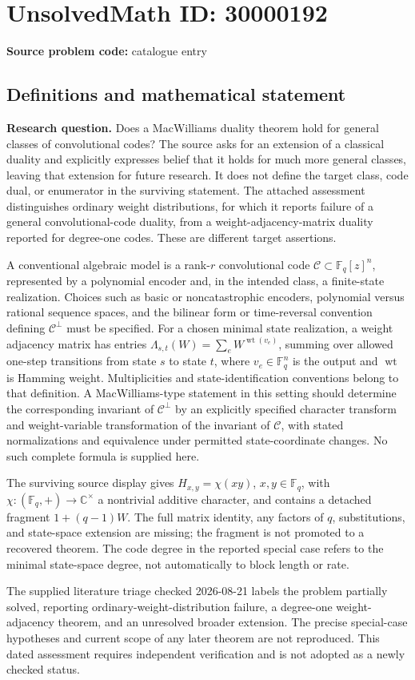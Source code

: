 \documentclass[11pt]{article}
\newcommand{\C}{\mathbb{C}}
\newcommand{\F}{\mathbb{F}}
\begin{document}
\section*{UnsolvedMath ID: 30000192}
\textbf{Source problem code:} catalogue entry
\subsection{Definitions and mathematical statement}
\textbf{Research question.} Does a MacWilliams duality theorem hold for general classes of convolutional codes? The source asks for an extension of a classical duality and explicitly expresses belief that it holds for much more general classes, leaving that extension for future research. It does not define the target class, code dual, or enumerator in the surviving statement. The attached assessment distinguishes ordinary weight distributions, for which it reports failure of a general convolutional-code duality, from a weight-adjacency-matrix duality reported for degree-one codes. These are different target assertions.\par A conventional algebraic model is a rank-\(r\) convolutional code \(\mathcal C\subset\F_q[z]^n\), represented by a polynomial encoder and, in the intended class, a finite-state realization. Choices such as basic or noncatastrophic encoders, polynomial versus rational sequence spaces, and the bilinear form or time-reversal convention defining \(\mathcal C^\perp\) must be specified. For a chosen minimal state realization, a weight adjacency matrix has entries \(\Lambda_{s,t}(W)=\sum_e W^{\operatorname{wt}(v_e)}\), summing over allowed one-step transitions from state \(s\) to state \(t\), where \(v_e\in\F_q^n\) is the output and \(\operatorname{wt}\) is Hamming weight. Multiplicities and state-identification conventions belong to that definition. A MacWilliams-type statement in this setting should determine the corresponding invariant of \(\mathcal C^\perp\) by an explicitly specified character transform and weight-variable transformation of the invariant of \(\mathcal C\), with stated normalizations and equivalence under permitted state-coordinate changes. No such complete formula is supplied here.\par The surviving source display gives \(H_{x,y}=\chi(xy)\), \(x,y\in\F_q\), with \(\chi:(\F_q,+)\to\C^\times\) a nontrivial additive character, and contains a detached fragment \(1+(q-1)W\). The full matrix identity, any factors of \(q\), substitutions, and state-space extension are missing; the fragment is not promoted to a recovered theorem. The code degree in the reported special case refers to the minimal state-space degree, not automatically to block length or rate.\par The supplied literature triage checked 2026-08-21 labels the problem partially solved, reporting ordinary-weight-distribution failure, a degree-one weight-adjacency theorem, and an unresolved broader extension. The precise special-case hypotheses and current scope of any later theorem are not reproduced. This dated assessment requires independent verification and is not adopted as a newly checked status.
\end{document}
